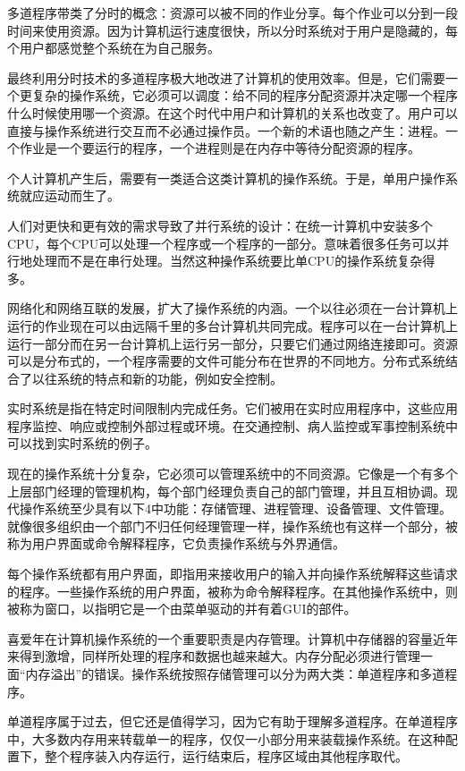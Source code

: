 多道程序带类了分时的概念：资源可以被不同的作业分享。每个作业可以分到一段时间来使用资源。因为计算机运行速度很快，所以分时系统对于用户是隐藏的，每个用户都感觉整个系统在为自己服务。

最终利用分时技术的多道程序极大地改进了计算机的使用效率。但是，它们需要一个更复杂的操作系统，它必须可以调度：给不同的程序分配资源并决定哪一个程序什么时候使用哪一个资源。在这个时代中用户和计算机的关系也改变了。用户可以直接与操作系统进行交互而不必通过操作员。一个新的术语也随之产生：进程。一个作业是一个要运行的程序，一个进程则是在内存中等待分配资源的程序。

个人计算机产生后，需要有一类适合这类计算机的操作系统。于是，单用户操作系统就应运动而生了。

人们对更快和更有效的需求导致了并行系统的设计：在统一计算机中安装多个CPU，每个CPU可以处理一个程序或一个程序的一部分。意味着很多任务可以并行地处理而不是在串行处理。当然这种操作系统要比单CPU的操作系统复杂得多。

网络化和网络互联的发展，扩大了操作系统的内涵。一个以往必须在一台计算机上运行的作业现在可以由远隔千里的多台计算机共同完成。程序可以在一台计算机上运行一部分而在另一台计算机上运行另一部分，只要它们通过网络连接即可。资源可以是分布式的，一个程序需要的文件可能分布在世界的不同地方。分布式系统结合了以往系统的特点和新的功能，例如安全控制。

实时系统是指在特定时间限制内完成任务。它们被用在实时应用程序中，这些应用程序监控、响应或控制外部过程或环境。在交通控制、病人监控或军事控制系统中可以找到实时系统的例子。

现在的操作系统十分复杂，它必须可以管理系统中的不同资源。它像是一个有多个上层部门经理的管理机构，每个部门经理负责自己的部门管理，并且互相协调。现代操作系统至少具有以下4中功能：存储管理、进程管理、设备管理、文件管理。就像很多组织由一个部门不归任何经理管理一样，操作系统也有这样一个部分，被称为用户界面或命令解释程序，它负责操作系统与外界通信。

每个操作系统都有用户界面，即指用来接收用户的输入并向操作系统解释这些请求的程序。一些操作系统的用户界面，被称为命令解释程序。在其他操作系统中，则被称为窗口，以指明它是一个由菜单驱动的并有着GUI的部件。

喜爱年在计算机操作系统的一个重要职责是内存管理。计算机中存储器的容量近年来得到激增，同样所处理的程序和数据也越来越大。内存分配必须进行管理一面“内存溢出”的错误。操作系统按照存储管理可以分为两大类：单道程序和多道程序。

单道程序属于过去，但它还是值得学习，因为它有助于理解多道程序。在单道程序中，大多数内存用来转载单一的程序，仅仅一小部分用来装载操作系统。在这种配置下，整个程序装入内存运行，运行结束后，程序区域由其他程序取代。

